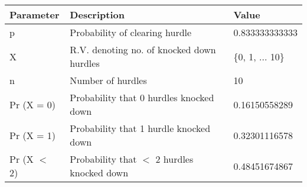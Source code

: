 \begin{tabular}{|l|l|l|}\hline
Parameter	&Description	&Value\\ \hline
p	&Probability of clearing hurdle	&0.833333333333\\ \hline
X	&R.V. denoting no. of knocked down hurdles	&\{0, 1, ... 10\}\\ \hline
n	&Number of hurdles	&10\\ \hline
Pr (X = 0)	&Probability that 0 hurdles knocked down	&0.16150558289\\ \hline
Pr (X = 1)	&Probability that 1 hurdle knocked down	&0.32301116578\\ \hline
Pr (X $<$  2)	&Probability that $<$ 2 hurdles knocked down	&0.48451674867\\ \hline
\end{tabular}
